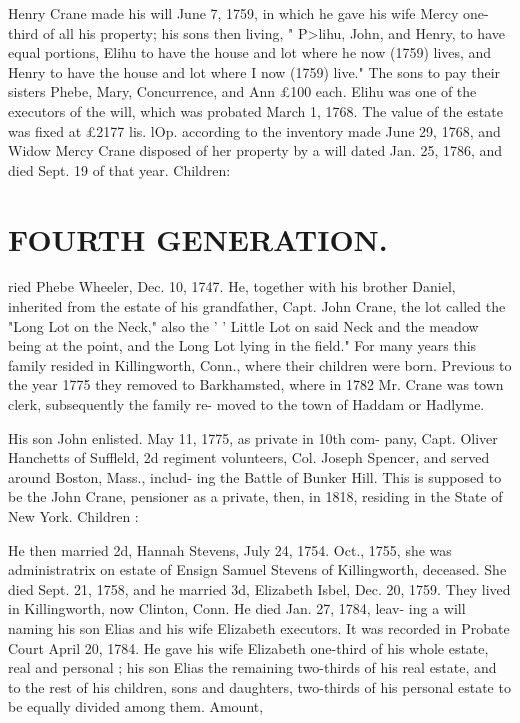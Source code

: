 \documentclass{book}
\begin{document}
Henry Crane made his will June 7, 1759, in which he gave his 
wife Mercy one-third of all his property; his sons then living, 
" P>lihu, John, and Henry, to have equal portions, Elihu to have 
the house and lot where he now (1759) lives, and Henry to have 
the house and lot where I now (1759) live." The sons to pay 
their sisters Phebe, Mary, Concurrence, and Ann £100 each. 
Elihu was one of the executors of the will, which was probated 
March 1, 1768. The value of the estate was fixed at £2177  
lis.  lOp. according to the inventory made June 29, 1768, and 
Widow Mercy Crane disposed of her property by a will dated 
Jan. 25, 1786, and died Sept. 19 of that year. Children: 












\section{FOURTH GENERATION.}


ried Phebe Wheeler, Dec. 10, 1747. He, together with his brother 
Daniel, inherited from the estate of his grandfather, Capt. John 
Crane, the lot called the "Long Lot on the Neck," also the 
' ' Little Lot on said Neck and the meadow being at the point, and 
the Long Lot lying in the field." For many years this family 
resided in Killingworth, Conn., where their children were born. 
Previous to the year 1775 they removed to Barkhamsted, where 
in 1782 Mr. Crane was town clerk, subsequently the family re- 
moved to the town of Haddam or Hadlyme. 

His son John enlisted. May 11, 1775, as private in 10th com- 
pany, Capt. Oliver Hanchetts of Suffleld, 2d regiment volunteers, 
Col. Joseph Spencer, and served around Boston, Mass., includ- 
ing the Battle of Bunker Hill. This is supposed to be the John 
Crane, pensioner as a private, then, in 1818, residing in the State 
of New York. Children : 








He then married 2d, Hannah Stevens, July 24, 1754. Oct., 
1755, she was administratrix on estate of Ensign Samuel Stevens 
of Killingworth, deceased. She died Sept. 21, 1758, and he 
married 3d, Elizabeth Isbel, Dec. 20, 1759. They lived in 
Killingworth, now Clinton, Conn. He died Jan. 27, 1784, leav- 
ing a will naming his son Elias and his wife Elizabeth executors. 
It was recorded in Probate Court April 20, 1784. He gave his 
wife Elizabeth one-third of his whole estate, real and personal ; 
his son Elias the remaining two-thirds of his real estate, and to 
the rest of his children, sons and daughters, two-thirds of his 
personal estate to be equally divided among them. Amount, 
\end{document}
